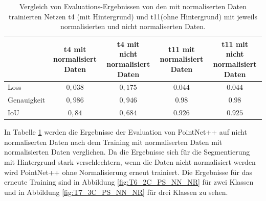 \documentclass[12pt,titlepage, twoside]{article}
\begin{document}
\begin{table}
    \begin{center}
    \begin{tabular}{|l || c | c || c | c | } 
        \hline
         & \thead{t4 mit \\ normalisiert Daten}  & \thead{t4 mit \\ nicht normalisiert Daten} & \thead{t11 mit \\ normalisiert Daten} & \thead{t11 mit \\ nicht normalisiert Daten}  \\  
        \hline
        \hline
        Loss & $0,038$ & $0,175$& $0.044$& $0.044$\\
        \hline
        Genauigkeit & $0,986$& $0,946$& $0.98$& $0.98$\\
        \hline
        IoU & $0,84$& $0,684$& $0.926$& $0.925$\\
        \hline
    \end{tabular}
    \end{center}
    \caption{Vergleich von Evaluations-Ergebnissen von den mit normaliserten Daten trainierten Netzen t4 (mit Hintergrund) und t11(ohne Hintergrund) mit jeweils normalisierten und nicht normaliserten Daten.}
    \label{tab:registration:deeplearn:compare}
\end{table}

In Tabelle \ref{tab:registration:deeplearn:compare} werden die Ergebnisse der Evaluation von PointNet++ auf nicht normaliserten Daten nach dem Training mit normaliserten Daten mit normalisierten Daten verglichen.
Da die Ergebnisse sich für die Segmentierung mit Hintergrund stark verschlechtern, wenn die Daten nicht normalisiert werden wird PointNet++ ohne Normalisierung erneut trainiert. 
Die Ergebnisse für das erneute Training sind in Abbildung \ref{fig:T6_2C_PS_NN_NR} für zwei Klassen und in Abbildung \ref{fig:T7_3C_PS_NN_NR} für drei Klassen zu sehen.
\end{document}

